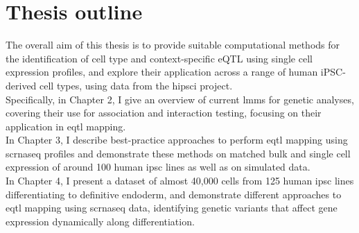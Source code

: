 \newpage

\section{Thesis outline}




The overall aim of this thesis is to provide suitable computational methods for the identification of cell type and context-specific eQTL using single cell expression profiles, 
and explore their application across a range of human iPSC-derived cell types, using data from the \gls{hipsci} project.\\



Specifically, in Chapter 2, I give an overview of current \glspl{lmm} for genetic analyses, covering their use for association and interaction testing, focusing on their application in \gls{eqtl} mapping.\\

In Chapter 3, I describe best-practice approaches to perform \gls{eqtl} mapping using \gls{scrnaseq} profiles and demonstrate these methods on matched bulk and single cell expression of around 100 human \gls{ipsc} lines as well as on simulated data.  \\

In Chapter 4, I present a dataset of almost 40,000 cells from 125 human \gls{ipsc} lines differentiating to definitive endoderm, and demonstrate different approaches to \gls{eqtl} mapping using \gls{scrnaseq} data, identifying genetic variants that affect gene expression dynamically along differentiation. \\

